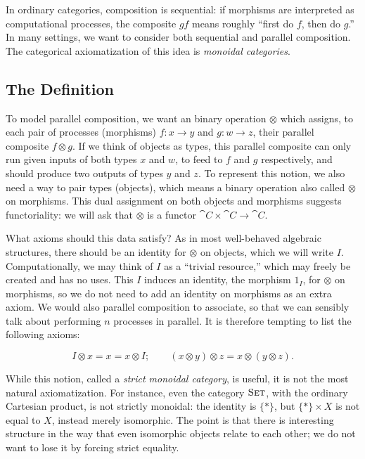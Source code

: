 In ordinary categories, composition is sequential: if morphisms are interpreted
as computational processes, the composite $gf$ means roughly ``first do $f$,
then do $g$.'' In many settings, we want to consider both sequential and
parallel composition. The categorical axiomatization of this idea is
\emph{monoidal categories}.

\subsection{The Definition}

To model parallel composition, we want an binary operation $\otimes$ which
assigns, to each pair of processes (morphisms) $f:x\to y$ and $g:w\to z$, their
parallel composite $f\otimes g$. If we think of objects as types, this parallel
composite can only run given inputs of both types $x$ and $w$, to feed to $f$
and $g$ respectively, and should produce two outputs of types $y$ and $z$. To
represent this notion, we also need a way to pair types (objects), which means a
binary operation also called $\otimes$ on morphisms. This dual assignment on
both objects and morphisms suggests functoriality: we will ask that $\otimes$ is
a functor $\cat{C}\times\cat{C}\to\cat{C}$.

What axioms should this data satisfy? As in most well-behaved algebraic
structures, there should be an identity for $\otimes$ on objects, which we will
write $I$. Computationally, we may think of $I$ as a ``trivial resource,'' which
may freely be created and has no uses. This $I$ induces an identity, the
morphism $1_I$, for $\otimes$ on morphisms, so we do not need to add an identity
on morphisms as an extra axiom. We would also parallel composition to associate,
so that we can sensibly talk about performing $n$ processes in parallel. It is
therefore tempting to list the following axioms:

\[
  I\otimes x = x = x\otimes I; \quad\quad (x\otimes y)\otimes z =
  x\otimes(y\otimes z).
\]

While this notion, called a \emph{strict monoidal category}, is useful, it is
not the most natural axiomatization. For instance, even the category
${\textsc{\text{Set}}}$, with the ordinary Cartesian product, is not strictly monoidal: the
identity is $\{*\}$, but $\{*\}\times X$ is not equal to $X$, instead merely
isomorphic. The point is that there is interesting structure in the way that
even isomorphic objects relate to each other; we do not want to lose it by
forcing strict equality.

